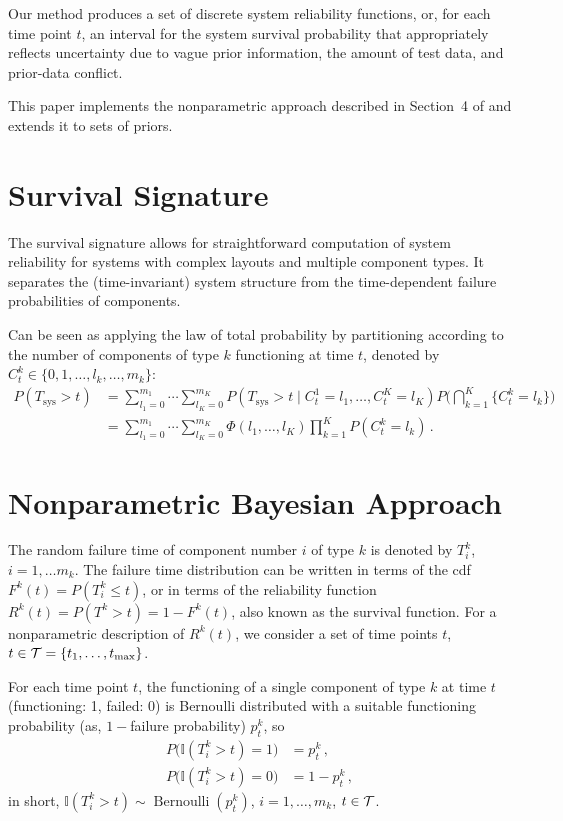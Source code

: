 \documentclass[authoryear, 12pt, a4paper]{elsarticle}
\def\Tsys{T_\text{sys}}
\newcommand{\indic}{\mathbb{I}}
\newcommand{\ber}{\operatorname{Bernoulli}}
\def\tmax{t_\text{max}}
\newcommand{\ptk}{p^k_t}
\begin{document}
Our method produces a set of discrete system reliability functions,
or, for each time point $t$, an interval for the system survival probability
that appropriately reflects uncertainty due to vague prior information, the amount of test data, and prior-data conflict.

This paper implements the nonparametric approach described in Section~4 of \citet{2015:bayessurvsign}
and extends it to sets of priors.

\section{Survival Signature}

The survival signature allows for straightforward computation of system reliability
for systems with complex layouts and multiple component types.
It separates the (time-invariant) system structure from the time-dependent failure probabilities of components.

Can be seen as applying the law of total probability by partitioning
according to the number of components of type $k$ functioning at time $t$,
denoted by $C^k_t \in \{0, 1, \ldots, l_k, \ldots, m_k\}$:
\begin{align*}
P(\Tsys > t)
 &= \sum_{l_1=0}^{m_1} \cdots \sum_{l_K=0}^{m_K} P(\Tsys > t \mid C^1_t = l_1,\ldots, C^K_t = l_K)
                                                 P\Big( \bigcap_{k=1}^K \{ C^k_t = l_k\} \Big) \\
 &= \sum_{l_1=0}^{m_1} \cdots \sum_{l_K=0}^{m_K} \Phi(l_1, \ldots, l_K)
                                                 \prod_{k=1}^K P(C^k_t = l_k) \,.
\end{align*}


\section{Nonparametric Bayesian Approach}

The random failure time of component number $i$ of type $k$ is denoted by $T^k_i$, $i = 1, \ldots m_k$.
The failure time distribution can be written in terms of the cdf $F^k(t) = P(T^k_i \le t)$,
or in terms of the reliability function $R^k(t) = P(T^k > t) = 1 - F^k(t)$,
also known as the survival function.
For a nonparametric description of $R^k(t)$,
we consider a set of time points $t$, $t \in {\cal T} = \{t_1, \ldots, \tmax\}$.

For each time point $t$, the functioning of a single component of type $k$ at time $t$ (functioning: 1, failed: 0)
is Bernoulli distributed with a suitable functioning probability (as, $1-$failure probability) $\ptk$, so
\begin{align*}
P\big(\indic(T^k_i > t) = 1\big) &= \ptk\,, \\
P\big(\indic(T^k_i > t) = 0\big) &= 1 - \ptk\,,
\end{align*}
in short, $\indic(T^k_i > t) \sim \ber(\ptk)$, $i = 1, \ldots, m_k$, $t \in {\cal T}$.
\end{document}
